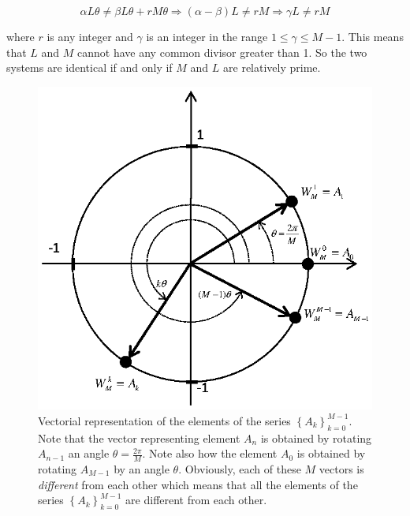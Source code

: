 \documentclass[a4paper,11pt,oneside]{article}
\begin{document}
\[
\alpha L\theta \neq \beta L\theta + rM\theta \Rightarrow (\alpha-\beta)L \neq rM \Rightarrow \gamma L \neq rM 
\]

where $r$ is any integer and $\gamma$ is an integer in the range $1\leq \gamma \leq M-1$. This means that $L$ and $M$ cannot have any common divisor greater than 1. So the two systems are identical if and only if $M$ and $L$ are relatively prime.


\begin{figure}[h!]
\centering
\includegraphics[width=.6\textwidth]{argandA.eps}
\caption{Vectorial representation of the elements of the series $\left\{A_{k}\right\}_{k=0}^{M-1}$. Note that the vector representing element $A_{n}$ is obtained by rotating $A_{n-1}$ an angle $\theta=\frac{2\pi}{M}$. Note also how the element $A_{0}$ is obtained by rotating $A_{M-1}$ by an angle $\theta$. Obviously, each of these $M$ vectors is \emph{different} from each other which means that all the elements of the series $\left\{A_{k}\right\}_{k=0}^{M-1}$ are different from each other.}
\label{argandA}
\end{figure}
\end{document}
